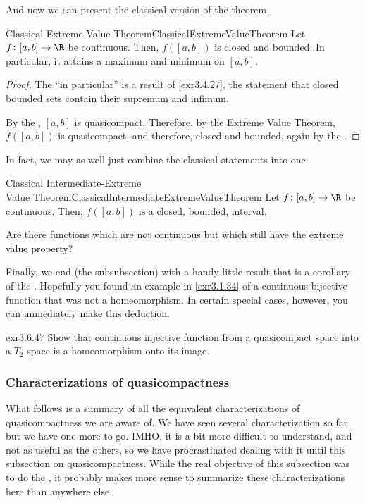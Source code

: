 And now we can present the classical version of the theorem.
\begin{crl}{Classical Extreme Value Theorem\hfill}{ClassicalExtremeValueTheorem}
Let $f\colon [a,b]\rightarrow \R$ be continuous.  Then, $f([a,b])$ is closed and bounded.  In particular, it attains a maximum and minimum on $[a,b]$.
\begin{proof}
The ``in particular'' is a result of \cref{exr3.4.27}, the statement that closed bounded sets contain their supremum and infimum.

By the , $[a,b]$ is quasicompact.  Therefore, by the Extreme Value Theorem, $f([a,b])$ is quasicompact, and therefore, closed and bounded, again by the .
\end{proof}
\end{crl}

In fact, we may as well just combine the classical statements into one.
\begin{crl}{Classical Intermediate-Extreme \\ Value Theorem}{ClassicalIntermediateExtremeValueTheorem}
Let $f\colon [a,b]\rightarrow \R$ be continuous.  Then, $f([a,b])$ is a closed, bounded, interval.
\end{crl}

\begin{exr}{}{}
Are there functions which are not continuous but which still have the extreme value property?
\end{exr}

Finally, we end (the subsubsection) with a handy little result that is a corollary of the .  Hopefully you found an example in \cref{exr3.1.34} of a continuous bijective function that was not a homeomorphism.  In certain special cases, however, you can immediately make this deduction.
\begin{exr}{}{exr3.6.47}
Show that continuous injective function from a quasicompact space into a $T_2$ space is a homeomorphism onto its image.
\end{exr}

\subsubsection{Characterizations of quasicompactness}

What follows is a summary of all the equivalent characterizations of quasicompactness we are aware of.  We have seen several characterization so far, but we have one more to go.  IMHO, it is a bit more difficult to understand, and not as useful as the others, so we have procrastinated dealing with it until this subsection on quasicompactness.  While the real objective of this subsection was to do the , it probably makes more sense to summarize these characterizations here than anywhere else.


